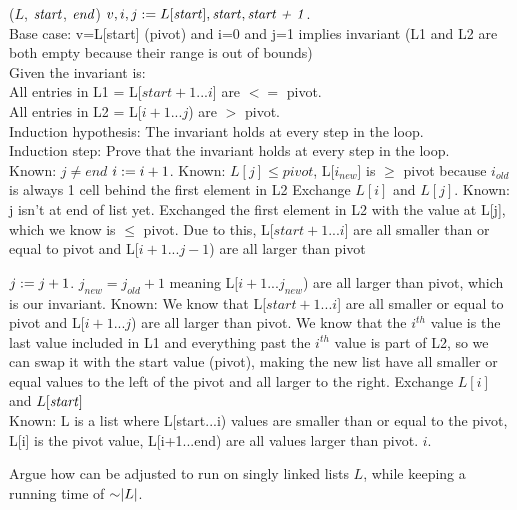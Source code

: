 \begin{problem}
\begin{questions}
\begin{myalgo}{($L$, $\textit{start\/}$, $\textit{end\/}$)}
    \STATE $v, i, j := L[\textit{start\/}], \textit{start\/}, \textit{start + 1\/}$.\\
    Base case: v=L[start] (pivot) and i=0 and j=1 implies invariant (L1 and L2 are both empty because their range is out of bounds) \\
    Given the invariant is: \\
    All entries in L1 = L[$start+1$...$i$] are $<=$ pivot.\\
    All entries in L2 = L[$i + 1$...$j$) are $>$ pivot.\\
    Induction hypothesis: The invariant holds at every step in the loop.\\
    Induction step: Prove that the invariant holds at every step in the loop.\\
    \label{alg:while}
    \STATE Known: $j \neq end$
            \STATE $i := i + 1$.
            \STATE Known: $L[j] \leq pivot$, L[$i_{new}$] is $\geq$ pivot because $i_{old}$ is always 1 cell behind the first element in L2
            \STATE Exchange $L[i]$ and $L[j]$.
            \STATE Known: j isn't at end of list yet. Exchanged the first element in L2 with the value at L[j], which we know is $\leq$ pivot. Due to this, L[$start+1$...$i$] are all smaller than or equal to pivot and L[$i + 1$...$j-1$) are all larger than pivot 
    
        \ENDIF
        \STATE $j := j + 1$.
        \STATE $j_{new} = j_{old} + 1$ meaning L[$i + 1$...$j_{new}$) are all larger than pivot, which is our invariant.
    \ENDWHILE
    \STATE Known: We know that L[$start+1$...$i$] are all smaller or equal to pivot and L[$i + 1$...$j$) are all larger than pivot. We know that the $i^{th}$ value is the last value included in L1 and everything past the $i^{th}$ value is part of L2, so we can swap it with the start value (pivot), making the new list have all smaller or equal values to the left of the pivot and all larger to the right.
    \STATE Exchange $L[i]$ and $L[\textit{start\/}]$
    \\Known: L is a list where L[start...i) values are smaller than or equal to the pivot, L[i] is the pivot value, L[i+1...end) are all values larger than pivot.
    \RETURN $i$.
\end{myalgo}

    \item Argue how  can be adjusted to run on singly linked lists $L$, while keeping a running time of $\mathord{\sim}\lvert L \rvert$.\\


\end{questions}
\end{problem}
